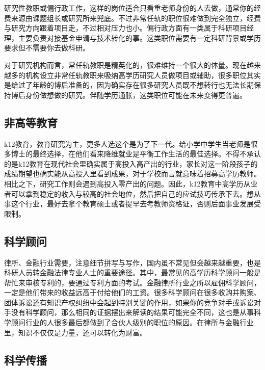 \documentclass[]{tufte-book}
\begin{document}
研究性教职或偏行政工作，这样的岗位适合只看重老师身份的人去做，通常你的经费来源由课题组长或研究所来兜底。不过非常任轨的职位很难做到完全独立，经费与研究方向跟着项目走，不过相对压力也小。偏行政方面有一类属于科研项目经理，主要负责对接基金申请与技术转化的事。这类职位需要有一定科研背景或学历要求但不需要你去做科研。

对于研究机构而言，常任轨教职是精英化的，很难维持一个很大的体量。现在越来越多的机构设立非常任轨教职来吸纳高学历研究人员做项目或辅助，很多职位其实是给过了年龄的博后准备的，因为确实存在很多研究人员既不想转行也无法长期保持博后身份做想做的研究。伴随学历通胀，这类职位可能在未来变得更普遍。

\hypertarget{ux975eux9ad8ux7b49ux6559ux80b2}{%
\subsection{非高等教育}\label{ux975eux9ad8ux7b49ux6559ux80b2}}

k12教育，教育研究为主，更多人选这个是为了下一代。给小学中学生当老师是很多博士的最终选择，在他们看来降维就业是平衡工作生活的最佳选择。不得不承认的是k12教育在现代社会里确实属于高投入高产出的行业，家长对这一阶段孩子的成绩期望也确实能从高投入里看到成果，对于学校而言就意味着招募高学历教师。相比之下，研究工作则会遇到高投入零产出的问题。因此，k12教育中高学历从业者可以拿到稳定的收入与较高的社会地位，然后把自己的应试技巧传承下去。想从事这个行业，最好去拿个教育硕士或者提早去考教师资格证，否则后面事业发展受限制。

\hypertarget{ux79d1ux5b66ux987eux95ee}{%
\subsection{科学顾问}\label{ux79d1ux5b66ux987eux95ee}}

律所、金融行业需要，注意细节拼写与写作，国内虽不常见但会越来越重要，也是科研人员转金融法律专业人士的重要途径。其中，最常见的高学历科学顾问一般是帮忙来审核专利的，要通过专利方面的考试。金融律所行业之所以雇佣科学顾问，一定是他们带来的收益远高于付给他们的工资。很多科学顾问在很多收购并购案、团体诉讼还有知识产权纠纷中会起到特别关键的作用，如果你的竞争对手或诉讼对手没有科学顾问，那么相同的证据摆出来解读的结果可能完全不同，这也是从事科学顾问行业的人很多最后都做到了合伙人级别的职位的原因。在律所与金融行业里，知识不仅仅是力量，还可以转化为财富。

\hypertarget{ux79d1ux5b66ux4f20ux64ad}{%
\subsection{科学传播}\label{ux79d1ux5b66ux4f20ux64ad}}
\end{document}
